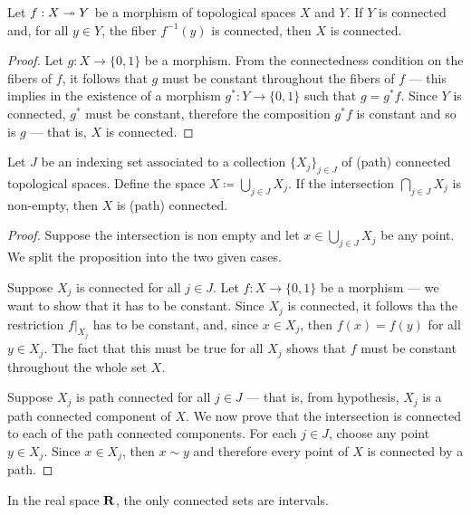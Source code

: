 \begin{proposition}
\label{prop:connectivity-quotients}
Let \(f: X \twoheadrightarrow Y\) be a morphism of topological spaces \(X\) and \(Y\). If
\(Y\) is connected and, for all \(y \in Y\), the fiber \(f^{-1}(y)\) is
connected, then \(X\) is connected.
\end{proposition}

\begin{proof}
Let \(g: X \to \{0, 1\}\) be a morphism. From the connectedness condition on the
fibers of \(f\), it follows that \(g\) must be constant throughout the fibers of
\(f\) --- this implies in the existence of a morphism \(g^{*}: Y \to \{0, 1\}\)
such that \(g = g^{*} f\). Since \(Y\) is connected, \(g^{*}\) must be constant,
therefore the composition \(g^{*} f\) is constant and so is \(g\) --- that is,
\(X\) is connected.
\end{proof}

\begin{proposition}
\label{prop:union-path-connected}
Let \(J\) be an indexing set associated to a collection \(\{X_{j}\}_{j \in J}\)
of (path) connected topological spaces. Define the space \(X \coloneq \bigcup_{j
\in J} X_j\). If the intersection \(\bigcap_{j \in J} X_j\) is non-empty, then
\(X\) is (path) connected.
\end{proposition}

\begin{proof}
Suppose the intersection is non empty and let \(x \in \bigcup_{j \in J}
X_j\) be any point. We split the proposition into the two given cases.

Suppose \(X_j\) is connected for all \(j \in J\). Let \(f: X \to \{0, 1\}\) be a
morphism --- we want to show that it has to be constant. Since \(X_j\) is
connected, it follows tha the restriction \(f|_{X_j}\) has to be constant, and,
since \(x \in X_j\), then \(f(x) = f(y)\) for all \(y \in X_j\). The fact that
this must be true for all \(X_j\) shows that \(f\) must be constant throughout
the whole set \(X\).

Suppose \(X_j\) is path connected for all \(j \in J\) --- that is, from
hypothesis, \(X_j\) is a path connected component of \(X\). We now prove that
the intersection is connected to each of the path connected components. For each
\(j \in J\), choose any point \(y \in X_j\). Since \(x \in X_j\), then \(x \sim
y\) and therefore every point of \(X\) is connected by a path.
\end{proof}

\begin{theorem}
\label{thm:connected-interval-real-space}
In the real space \(\mathbf{R}\), the only connected sets are intervals.
\end{theorem}

